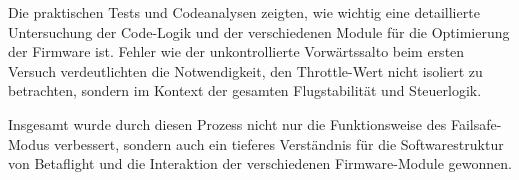 Die praktischen Tests und Codeanalysen zeigten, wie wichtig eine detaillierte Untersuchung der Code-Logik und der verschiedenen Module für die Optimierung der Firmware ist. Fehler wie der unkontrollierte Vorwärtssalto beim ersten Versuch verdeutlichten die Notwendigkeit, den Throttle-Wert nicht isoliert zu betrachten, sondern im Kontext der gesamten Flugstabilität und Steuerlogik.

Insgesamt wurde durch diesen Prozess nicht nur die Funktionsweise des Failsafe-Modus verbessert, sondern auch ein tieferes Verständnis für die Softwarestruktur von Betaflight und die Interaktion der verschiedenen Firmware-Module gewonnen. 












